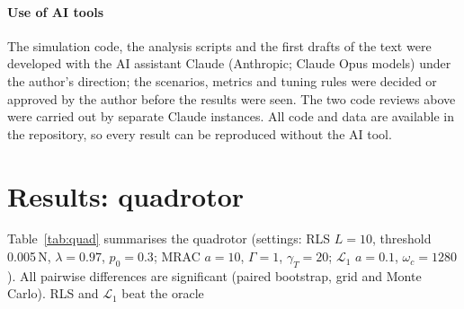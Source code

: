\documentclass[preprint,12pt,a4paper]{elsarticle}
\begin{document}
\paragraph{Use of AI tools} The simulation code, the analysis scripts and the first drafts of the text were developed with the AI
assistant Claude (Anthropic; Claude Opus models) under the author's direction; the scenarios, metrics and tuning rules were decided or
approved by the author before the results were seen. The two code reviews above were carried out by separate Claude instances. All
code and data are available in the repository, so every result can be reproduced without the AI tool.

\section{Results: quadrotor}
\begin{table}[t]
\centering\small
\caption{Quadrotor. Mean peak attitude error, gap closed with 95\,\% bootstrap interval, gust response and delay margin. No run is lost.}
\label{tab:quad}
\end{table}
Table~\ref{tab:quad} summarises the quadrotor (settings: RLS $L = 10$, threshold 0.005\,N, $\lambda = 0.97$, $p_0 = 0.3$; MRAC $a = 10$,
$\Gamma = 1$, $\gamma_T = 20$; $\mathcal{L}_1$ $a = 0.1$, $\omega_c = 1280$). All pairwise differences are significant (paired bootstrap, grid
and Monte Carlo). RLS and $\mathcal{L}_1$ beat the oracle
\end{document}

